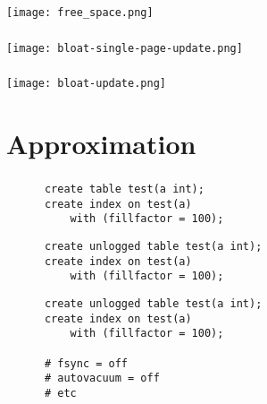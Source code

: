 \documentclass[usenames,dvipsnames, 18pt, compress, aspectratio=169]{beamer}
\begin{document}
\begin{frame}[fragile]{}
    \frametitle{}
    \begin{center}

        \texttt{[image: free\_space.png]}

    \end{center}
\end{frame}

\begin{frame}[fragile]{}
    \frametitle{}
    \begin{center}

        \texttt{[image: bloat-single-page-update.png]}

    \end{center}
\end{frame}

\begin{frame}[fragile]{}
    \frametitle{}
    \begin{center}

        \texttt{[image: bloat-update.png]}

    \end{center}
\end{frame}

\section{Approximation}

\begin{frame}[fragile]{}
    \frametitle{}

    \begin{overprint}[\textwidth]
        \begin{verbatim}
      create table test(a int);
      create index on test(a)
          with (fillfactor = 100);
        \end{verbatim}

        \begin{verbatim}
      create unlogged table test(a int);
      create index on test(a)
          with (fillfactor = 100);
        \end{verbatim}

        \begin{verbatim}
      create unlogged table test(a int);
      create index on test(a)
          with (fillfactor = 100);

      # fsync = off
      # autovacuum = off
      # etc
        \end{verbatim}

    \end{overprint}

\end{frame}
\end{document}
